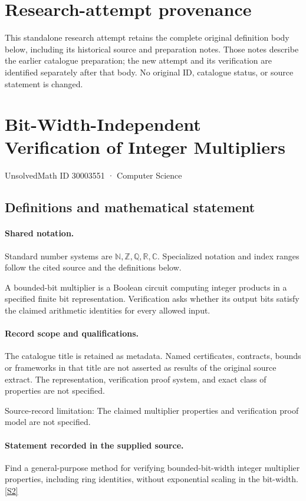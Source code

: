 \documentclass[11pt]{article}
\begin{document}
\section*{Research-attempt provenance}
This standalone research attempt retains the complete original definition body below,
including its historical source and preparation notes. Those notes describe the
earlier catalogue preparation; the new attempt and its verification are identified
separately after that body. No original ID, catalogue status, or source statement is changed.

\section{Bit-Width-Independent Verification of Integer Multipliers}\label{30003551}
{\small UnsolvedMath ID 30003551 · Computer Science}
\subsection{Definitions and mathematical statement}

\paragraph{Shared notation.}Standard number systems are $\mathbb N,\mathbb Z,\mathbb Q,\mathbb R,\mathbb C$. Specialized notation and index ranges follow the cited source and the definitions below.


A bounded-bit multiplier is a Boolean circuit computing integer products in a specified finite bit representation. Verification asks whether its output bits satisfy the claimed arithmetic identities for every allowed input.
\paragraph{Record scope and qualifications.}
The catalogue title is retained as metadata. Named certificates, contracts, bounds or frameworks in that title are not asserted as results of the original source extract.
The representation, verification proof system, and exact class of properties are not specified.

Source-record limitation: The claimed multiplier properties and verification proof model are not specified.
\paragraph{Statement recorded in the supplied source.}
Find a general-purpose method for verifying bounded-bit-width integer multiplier properties, including ring identities, without exponential scaling in the bit-width. \href{https://doi.org/10.4171/owr/2017/37}{[S2]}
\end{document}
